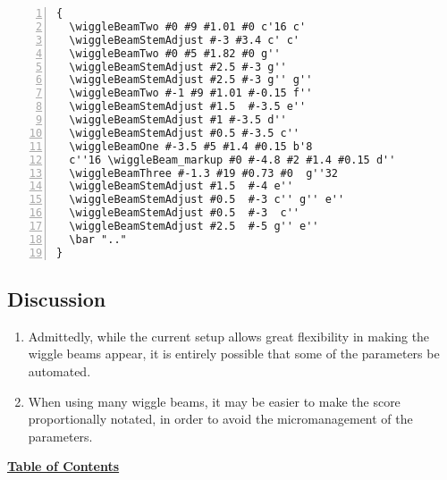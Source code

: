 \begin{Verbatim}[numbers=left,xleftmargin=5mm]
{
  \wiggleBeamTwo #0 #9 #1.01 #0 c'16 c'
  \wiggleBeamStemAdjust #-3 #3.4 c' c'
  \wiggleBeamTwo #0 #5 #1.82 #0 g''
  \wiggleBeamStemAdjust #2.5 #-3 g''
  \wiggleBeamStemAdjust #2.5 #-3 g'' g''
  \wiggleBeamTwo #-1 #9 #1.01 #-0.15 f''
  \wiggleBeamStemAdjust #1.5  #-3.5 e''
  \wiggleBeamStemAdjust #1 #-3.5 d''
  \wiggleBeamStemAdjust #0.5 #-3.5 c''
  \wiggleBeamOne #-3.5 #5 #1.4 #0.15 b'8 
  c''16 \wiggleBeam_markup #0 #-4.8 #2 #1.4 #0.15 d''
  \wiggleBeamThree #-1.3 #19 #0.73 #0  g''32
  \wiggleBeamStemAdjust #1.5  #-4 e''
  \wiggleBeamStemAdjust #0.5  #-3 c'' g'' e''
  \wiggleBeamStemAdjust #0.5  #-3  c''
  \wiggleBeamStemAdjust #2.5  #-5 g'' e''
  \bar ".."
}
\end{Verbatim}
\vfill \break

\subsection{Discussion}
\begin{enumerate}
\item Admittedly, while the current setup allows great flexibility in making the wiggle beams appear, it is entirely possible that some of the parameters be automated. 
\item When using many wiggle beams, it may be easier to make the score proportionally notated, in order to avoid the micromanagement of the parameters. 
\end{enumerate}
\hyperref[sec:toc]{\textbf{Table of Contents}}
